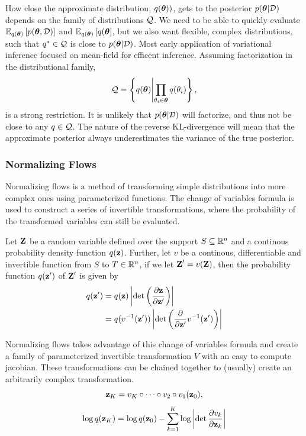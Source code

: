 \documentclass[twoside]{article}
\begin{document}
How close the approximate distribution, \(q(\boldsymbol \theta))\), gets to the posterior
\(p(\boldsymbol \theta \vert \mathcal{D})\) depends on the family of distributions \(\mathcal{Q}\).
We need to be able to quickly evaluate \(\mathbb{E}_{q(\boldsymbol \theta)} \left[ p(\boldsymbol \theta, \mathcal{D}) \right]\) and
\(\mathbb{E}_{q(\boldsymbol \theta)} \left[ q(\boldsymbol \theta \right]\), but we also want flexible, complex distributions,
such that \(q^* \in \mathcal{Q}\) is close to \(p(\boldsymbol \theta \vert \mathcal{D})\). Most
early application of variational inference focused on mean-field for efficent
inference. Assuming factorization in the distributional family,
\begin{equation}
  \mathcal{Q} =
  \left\{ q(\boldsymbol \theta) \middle\vert \prod_{\theta_i \in \boldsymbol \theta}{q(\theta_i)} \right\},
\end{equation}
is a strong restriction. It is unlikely that \(p(\boldsymbol \theta \vert \mathcal{D})\) will 
factorize, and thus not be close to any \(q \in \mathcal{Q}\). The nature of the
reverse KL-divergence will mean that the approximate posterior always
underestimates the variance of the true posterior.

\subsubsection{Normalizing Flows}
Normalizing flows is a method of transforming simple distributions into more
complex ones using parameterized functions. The change of variables formula is
used to construct a series of invertible transformations, where the probability
of the transformed variables can still be evaluated.

Let \(\textbf{Z}\) be a random variable defined over the support \(S \subseteq \mathbb{R}^n\)
and a continous probability density function \(q(\textbf{z})\). Further, let \(v\) be
a continous, differentiable and invertible function from \(S\) to
\(T \in \mathbb{R}^n\), if we let \(\textbf{Z}^\prime = v(\textbf{Z})\), then the probability
function \(q(\textbf{z}^\prime)\) of \(\textbf{Z}^\prime\) is given by
\begin{align}
  q(\textbf{z}^\prime) &= q(\textbf{z}) \left\lvert \det \left( \frac{\partial \textbf{z}}{
    \partial \textbf{z}^\prime} \right) \right\rvert \nonumber\\
  &= q(v^{-1}(\textbf{z}^\prime)) \left\lvert \det \left( \frac{\partial}{\partial
  \textbf{z}^\prime} v^{-1}(\textbf{z}^\prime) \right) \right\rvert
  \label{eq:change_var_form1}
\end{align}

Normalizing flows takes advantage of this change of variables formula and create
a family of parameterized invertible transformation \(V\) with an easy to 
compute jacobian. These transformations can be chained together to (usually)
create an arbitrarily complex transformation.
\begin{equation}
  \textbf{z}_K = v_K \circ \dots \circ v_2 \circ v_1(\textbf{z}_0),
\end{equation}
\begin{equation}
  \log q(\textbf{z}_K) = \log q(\textbf{z}_0) - \sum_{k=1}^K{\log \left\lvert \det
  \frac{\partial v_k}{\partial \textbf{z}_k} \right\rvert}
\end{equation}
\end{document}
